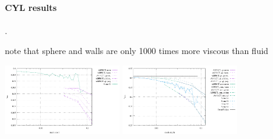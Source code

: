 \newpage
\paragraph{CYL results}.

note that sphere and walls are only 1000 times more viscous than fluid

\begin{center}
\includegraphics[width=5cm]{images/stokes_sphere3D/vrms_CYL}
\includegraphics[width=5cm]{images/stokes_sphere3D/max_vel_CYL}
\end{center}

